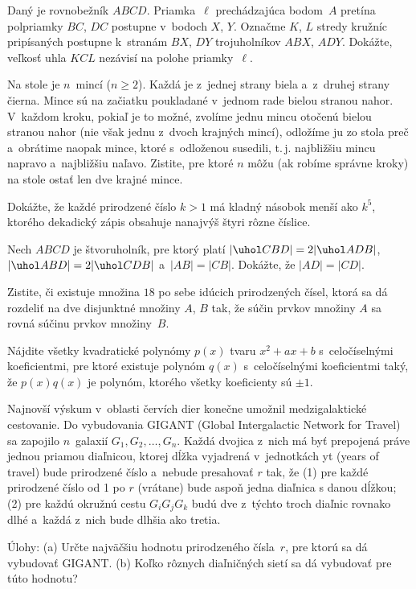 {%
Daný je rovnobežník $ABCD$. Priamka~$\ell$ prechádzajúca bodom~$A$ pretína polpriamky $BC$, $DC$ postupne v~bodoch $X$, $Y$. Označme $K$, $L$ stredy kružníc pripísaných postupne k~stranám $BX$, $DY$ trojuholníkov $ABX$, $ADY$. Dokážte, veľkosť uhla $KCL$ nezávisí na polohe priamky~$\ell$.
}

{%
Na stole je $n$~mincí ($n\ge2$). Každá je z~jednej strany biela a~z~druhej strany čierna. Mince sú na začiatku poukladané v~jednom rade bielou stranou nahor. V~každom kroku, pokiaľ je to možné, zvolíme jednu mincu otočenú bielou stranou nahor (nie však jednu z~dvoch krajných mincí), odložíme ju zo stola preč a~obrátime naopak mince, ktoré s~odloženou susedili, t.\,j. najbližšiu mincu napravo a~najbližšiu naľavo. Zistite, pre ktoré $n$ môžu (ak robíme správne kroky) na stole ostať len dve krajné mince.
}

{%
Dokážte, že každé prirodzené číslo $k>1$ má kladný násobok menší ako $k^5$, ktorého dekadický zápis obsahuje nanajvýš štyri rôzne číslice.}

{%
Nech $ABCD$ je štvoruholník, pre ktorý platí $|\uhol CBD|= 2|\uhol ADB|$, $|\uhol ABD|= 2|\uhol CDB|$ a~$|AB|=|CB|$. Dokážte, že $|AD|=|CD|$.}

{%
Zistite, či existuje množina $18$ po sebe idúcich prirodzených čísel, ktorá sa dá rozdeliť na dve disjunktné množiny 
$A$, $B$ tak, že súčin prvkov množiny $A$ sa rovná súčinu prvkov množiny~$B$.}

{%
Nájdite všetky kvadratické polynómy $p(x)$ tvaru $x^2+ax+b$ s~celočíselnými koeficientmi, pre ktoré existuje polynóm $q(x)$ s~celočíselnými koeficientmi taký, že $p(x)q(x)$ je polynóm, ktorého všetky koeficienty sú $\pm 1$.
}

{%
Najnovší výskum v~oblasti červích dier konečne umožnil
medzigalaktické cestovanie. Do vybudovania GIGANT (Global
Intergalactic Network for Travel) sa zapojilo $n$~galaxií
$G_1,G_2,\dots,G_n$. Každá dvojica z~nich má byť prepojená práve
jednou priamou diaľnicou, ktorej dĺžka vyjadrená v~jednotkách yt
(years of travel) bude prirodzené číslo a~nebude presahovať $r$ tak,
že
\ite (1)
pre každé prirodzené číslo od 1 po $r$ (vrátane) bude aspoň jedna diaľnica
s danou dĺžkou;
\ite (2)
pre každú okružnú cestu $G_iG_jG_k$ budú dve z~týchto troch diaľnic
rovnako dlhé a~každá z~nich bude dlhšia ako tretia.

Úlohy:
\ite (a)
Určte najväčšiu hodnotu prirodzeného čísla~$r$, pre ktorú sa dá
vybudovať GIGANT.
\ite (b)
Koľko rôznych diaľničných sietí sa dá vybudovať pre túto hodnotu?
}

